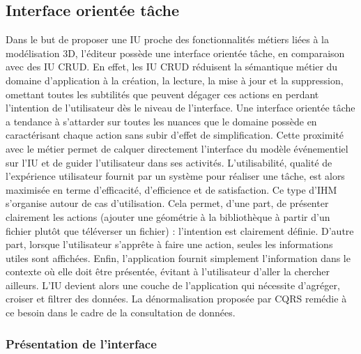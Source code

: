 \subsection{Interface orientée tâche}
\label{sec:task-based-ui}
Dans le but de proposer une \gls{IU} proche des fonctionnalités métiers liées à la 
modélisation \gls{3D}, l'éditeur possède une interface orientée \og tâche\fg{}, en 
comparaison avec des \gls{IU} \gls{CRUD}. En effet, les \gls{IU} \gls{CRUD} 
réduisent la sémantique métier du domaine d'application à la création, la lecture, la 
mise à jour et la suppression, omettant toutes les subtilités que peuvent dégager 
ces actions en perdant l'intention de l'utilisateur dès le niveau de l'interface. Une 
interface orientée tâche a tendance à s'attarder sur toutes les nuances que le 
domaine possède en caractérisant chaque action sans subir d'effet de 
simplification. Cette proximité avec le métier permet de calquer directement 
l'interface du modèle événementiel sur l'\gls{IU} et de guider l'utilisateur dans ses 
activités. L'utilisabilité, qualité de l'expérience utilisateur fournit par un système 
pour réaliser une tâche, est alors maximisée en terme d'efficacité, d'efficience et 
de satisfaction. 
Ce type d'\gls{IHM} s'organise autour de cas d'utilisation. Cela permet, 
d'une part, de présenter clairement les 
actions (\og ajouter une géométrie à la 
bibliothèque à partir d'un fichier\fg{} plutôt que \og téléverser un fichier\fg{}) : 
l'intention est clairement définie. D'autre part, lorsque l'utilisateur s'apprête à faire 
une action, seules les informations utiles sont affichées. Enfin, l'application fournit 
simplement l'information dans le contexte où elle doit être présentée, évitant à 
l'utilisateur d'aller la chercher ailleurs.
L'\gls{IU} devient alors une couche de l'application qui nécessite d'agréger, croiser 
et filtrer des données. La dénormalisation proposée par \gls{CQRS} remédie à ce 
besoin dans le cadre de la consultation de données. 


\subsubsection{Présentation de l'interface}


